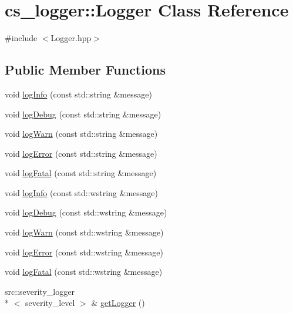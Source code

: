 \hypertarget{classcs__logger_1_1Logger}{\section{cs\-\_\-logger\-:\-:Logger Class Reference}
\label{classcs__logger_1_1Logger}
}


{\ttfamily \#include $<$Logger.\-hpp$>$}

\subsection*{Public Member Functions}
\begin{DoxyCompactItemize}
\item 
void \hyperlink{classcs__logger_1_1Logger_a2a4a2fa412e2a4cd169575fc756dd7c2}{log\-Info} (const std\-::string \&message)
\item 
void \hyperlink{classcs__logger_1_1Logger_a88b308f014615232282d0685681c3b79}{log\-Debug} (const std\-::string \&message)
\item 
void \hyperlink{classcs__logger_1_1Logger_a6da2c794e37af6cbab66c38739ec823c}{log\-Warn} (const std\-::string \&message)
\item 
void \hyperlink{classcs__logger_1_1Logger_a7c52f6593865a6087d85b4a4cb0c9c42}{log\-Error} (const std\-::string \&message)
\item 
void \hyperlink{classcs__logger_1_1Logger_a7b1cd9ebd4d44a322aa42d1bb84af359}{log\-Fatal} (const std\-::string \&message)
\item 
void \hyperlink{classcs__logger_1_1Logger_aa36dd68f50aca9710b3474d54dabf805}{log\-Info} (const std\-::wstring \&message)
\item 
void \hyperlink{classcs__logger_1_1Logger_aad6514941a88221438df7f2e9e300430}{log\-Debug} (const std\-::wstring \&message)
\item 
void \hyperlink{classcs__logger_1_1Logger_a8cb8239ea1ccc4e36dbebf986ca4df7e}{log\-Warn} (const std\-::wstring \&message)
\item 
void \hyperlink{classcs__logger_1_1Logger_a48e8c5e798e323d500916ce2e0a30f69}{log\-Error} (const std\-::wstring \&message)
\item 
void \hyperlink{classcs__logger_1_1Logger_ab09103beca84bc017ffd9f2909ea50c0}{log\-Fatal} (const std\-::wstring \&message)
\item 
src\-::severity\-\_\-logger\\*
$<$ severity\-\_\-level $>$ \& \hyperlink{classcs__logger_1_1Logger_a950ba8f27e60b5bb5f63b06156637a51}{get\-Logger} ()

\end{DoxyCompactItemize}
